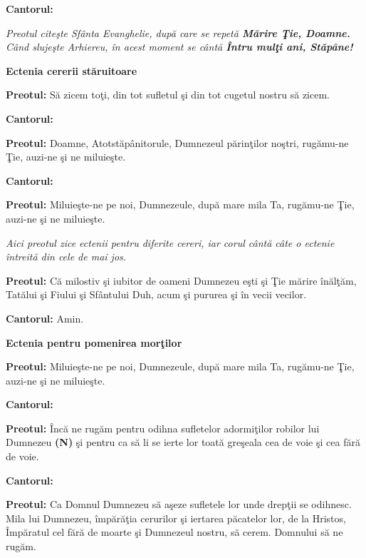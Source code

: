 \documentclass[11pt,letterpaper]{book} \usepackage{ucs}
\newcommand{\mysection}[1]{\begin{center}{\Large \bf #1}\end{center}}
\begin{document}
  {\bf Cantorul:}


  {\em Preotul citeşte Sfânta Evanghelie, după care se repetă {\bf
  Mărire Ţie, Doamne.} Când slujeşte Arhiereu, în acest moment se
  cântă {\bf Întru mulţi ani, Stăpâne!}}

  \mysection{Ectenia cererii stăruitoare}

  {\bf Preotul:} Să zicem toţi, din tot sufletul şi din tot cugetul
  nostru să zicem.

  {\bf Cantorul:}
  \begin{center}
  \end{center}

  {\bf Preotul:} Doamne, Atotstăpânitorule, Dumnezeul părinţilor
  noştri, rugămu-ne Ţie, auzi-ne şi ne miluieşte.

  {\bf Cantorul:}
  \begin{center}
  \end{center}

  {\bf Preotul:} Miluieşte-ne pe noi, Dumnezeule, după mare mila Ta,
  rugămu-ne Ţie, auzi-ne şi ne miluieşte.

  {\em Aici preotul zice ectenii pentru diferite cereri, iar corul
    cântă câte o ectenie întreită din cele de mai jos.}
  

  {\bf Preotul:} Că milostiv şi iubitor de oameni Dumnezeu eşti şi Ţie
  mărire înălţăm, Tatălui şi Fiului şi Sfântului Duh, acum şi pururea
  şi în vecii vecilor.

  {\bf Cantorul:} Amin.

  \mysection{Ectenia pentru pomenirea morţilor}

  {\bf Preotul:} Miluieşte-ne pe noi, Dumnezeule, după mare mila Ta,
  rugămu-ne Ţie, auzi-ne şi ne miluieşte.

  {\bf Cantorul:}


  {\bf Preotul:} Încă ne rugăm pentru odihna sufletelor adormiţilor
  robilor lui Dumnezeu {\bf (N)} şi pentru ca să li se ierte lor toată
  greşeala cea de voie şi cea fără de voie.

  {\bf Cantorul:}


  {\bf Preotul:} Ca Domnul Dumnezeu să aşeze sufletele lor unde
  drepţii se odihnesc. Mila lui Dumnezeu, împărăţia cerurilor şi
  iertarea păcatelor lor, de la Hristos, Împăratul cel fără de moarte
  şi Dumnezeul nostru, să cerem. Domnului să ne rugăm.
\end{document}
